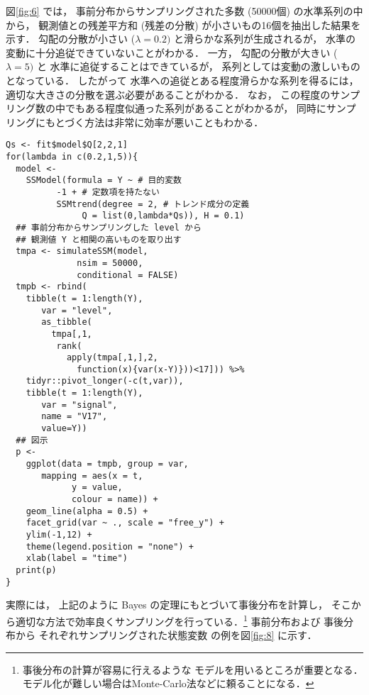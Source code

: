 \documentclass[10pt,oneside,fleqn]{scrartcl}
\begin{document}
図\ref{fig:6}
では，
事前分布からサンプリングされた多数 (50000個)
の水準系列の中から，
観測値との残差平方和 (残差の分散) が小さいもの16個を抽出した結果を示す．
勾配の分散が小さい (\(\lambda=0.2)\) と滑らかな系列が生成されるが，
水準の変動に十分追従できていないことがわかる．
一方，
勾配の分散が大きい (\(\lambda=5)\) と
水準に追従することはできているが，
系列としては変動の激しいものとなっている．
したがって
水準への追従とある程度滑らかな系列を得るには，
適切な大きさの分散を選ぶ必要があることがわかる．
なお，
この程度のサンプリング数の中でもある程度似通った系列があることがわかるが，
同時にサンプリングにもとづく方法は非常に効率が悪いこともわかる．

\begin{figure*}[htbp]
  \centering
\end{figure*}

\begin{verbatim}
Qs <- fit$model$Q[2,2,1]
for(lambda in c(0.2,1,5)){
  model <-
    SSModel(formula = Y ~ # 目的変数
	      -1 + # 定数項を持たない
	      SSMtrend(degree = 2, # トレンド成分の定義
		       Q = list(0,lambda*Qs)), H = 0.1)
  ## 事前分布からサンプリングした level から
  ## 観測値 Y と相関の高いものを取り出す
  tmpa <- simulateSSM(model,
		      nsim = 50000,
		      conditional = FALSE)
  tmpb <- rbind(
    tibble(t = 1:length(Y),
	   var = "level",
	   as_tibble(
	     tmpa[,1,
		  rank(
		    apply(tmpa[,1,],2,
			  function(x){var(x-Y)}))<17])) %>%
    tidyr::pivot_longer(-c(t,var)),
    tibble(t = 1:length(Y),
	   var = "signal",
	   name = "V17",
	   value=Y))
  ## 図示
  p <- 
    ggplot(data = tmpb, group = var,
	   mapping = aes(x = t,
			 y = value,
			 colour = name)) +
    geom_line(alpha = 0.5) +
    facet_grid(var ~ ., scale = "free_y") +
    ylim(-1,12) +
    theme(legend.position = "none") +
    xlab(label = "time")
  print(p)
}
\end{verbatim}

実際には，
上記のように Bayes の定理にもとづいて事後分布を計算し，
そこから適切な方法で効率良くサンプリングを行っている．\footnote{事後分布の計算が容易に行えるような
モデルを用いるところが重要となる．
モデル化が難しい場合はMonte-Carlo法などに頼ることになる．}
事前分布および
事後分布から
それぞれサンプリングされた状態変数
の例を図\ref{fig:8}
に示す．
\end{document}
